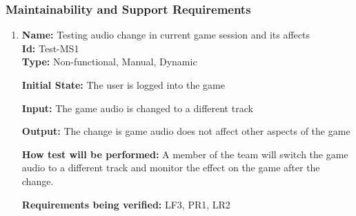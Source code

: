 \documentclass[12pt, titlepage]{article}
\begin{document}
\subsubsection{Maintainability and Support Requirements}
\begin{enumerate}
\item{\textbf{Name:} Testing audio change in current game session and its affects\\}\label{Test-MS1}
\textbf{Id:} Test-MS1\\

\textbf{Type:} Non-functional, Manual, Dynamic
					
\textbf{Initial State:} The user is logged into the game
					
\textbf{Input:} The game audio is changed to a different track 
					
\textbf{Output:} The change is game audio does not affect other aspects of the game
					
\textbf{How test will be performed:} A member of the team will switch the game audio to a different track and monitor the effect on the game after the change.

\textbf{Requirements being verified:} LF3, PR1, LR2
\end{enumerate}
\end{document}
